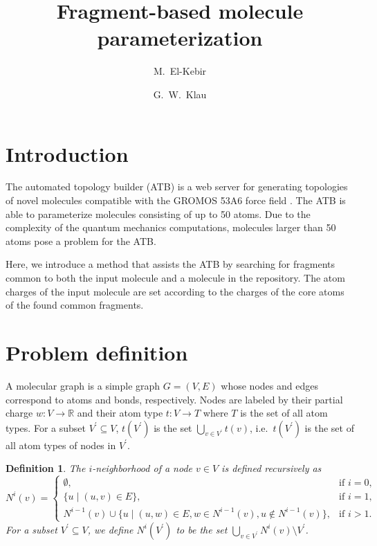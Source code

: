 \documentclass[11pt]{article}
\author{M.~El-Kebir \and  G.~W.~Klau}
\title{Fragment-based molecule parameterization}
\newtheorem{definition}{Definition}[section]
\begin{document}
\maketitle

\section{Introduction}

The automated topology builder (ATB) is a web server for generating topologies
of novel molecules compatible with the GROMOS 53A6 force field \cite{Malde11}.
The ATB is able to parameterize molecules consisting of up to 50 atoms. Due to
the complexity of the quantum mechanics computations, molecules larger than 50
atoms pose a problem for the ATB.

Here, we introduce a method that assists the ATB by searching for fragments
common to both the input molecule and a molecule in the repository. The atom
charges of the input molecule are set according to the charges of the core atoms
of the found common fragments.

\section{Problem definition}

A molecular graph is a simple graph $G=(V,E)$ whose nodes and edges correspond
to atoms and bonds, respectively. Nodes are labeled by their partial charge $w :
V \rightarrow \mathbb{R}$ and their atom type $t : V \rightarrow T$ where $T$ is
the set of all atom types. For a subset $V^\prime \subseteq V$, $t(V^\prime)$ is the
set $\bigcup_{v \in V^\prime} t(v)$, i.e.\ $t(V^\prime)$ is the set of all atom
types of nodes in $V^\prime$.

\begin{definition}
  The \emph{$i$-neighborhood} of a node $v \in V$ is defined recursively as
  \[
    N^i(v) = 
  \begin{cases}
    \emptyset, & \mbox{if $i=0$,}\\
    \{ u \mid (u,v) \in E \}, & \mbox{if $i=1$,}\\
    N^{i-1}(v) \cup \{ u \mid (u,w) \in E, w \in N^{i-1}(v), u \not \in
    N^{i-1}(v) \}, & \mbox{if $i > 1$.}
  \end{cases}
  \]
  For a subset $V^\prime \subseteq V$, we define $N^i(V^\prime)$ to
  be the set $\bigcup_{v \in V^\prime} N^i(v) \setminus V^\prime$.
\end{definition}
\end{document}
